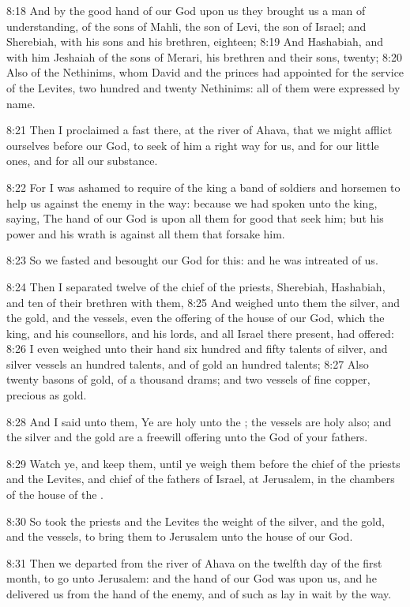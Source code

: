 8:18 And by the good hand of our God upon us they brought us a man of understanding, of the sons of Mahli, the son of Levi, the son of Israel; and Sherebiah, with his sons and his brethren, eighteen; 8:19 And Hashabiah, and with him Jeshaiah of the sons of Merari, his brethren and their sons, twenty; 8:20 Also of the Nethinims, whom David and the princes had appointed for the service of the Levites, two hundred and twenty Nethinims: all of them were expressed by name.

8:21 Then I proclaimed a fast there, at the river of Ahava, that we might afflict ourselves before our God, to seek of him a right way for us, and for our little ones, and for all our substance.

8:22 For I was ashamed to require of the king a band of soldiers and horsemen to help us against the enemy in the way: because we had spoken unto the king, saying, The hand of our God is upon all them for good that seek him; but his power and his wrath is against all them that forsake him.

8:23 So we fasted and besought our God for this: and he was intreated of us.

8:24 Then I separated twelve of the chief of the priests, Sherebiah, Hashabiah, and ten of their brethren with them, 8:25 And weighed unto them the silver, and the gold, and the vessels, even the offering of the house of our God, which the king, and his counsellors, and his lords, and all Israel there present, had offered: 8:26 I even weighed unto their hand six hundred and fifty talents of silver, and silver vessels an hundred talents, and of gold an hundred talents; 8:27 Also twenty basons of gold, of a thousand drams; and two vessels of fine copper, precious as gold.

8:28 And I said unto them, Ye are holy unto the \LORD; the vessels are holy also; and the silver and the gold are a freewill offering unto the \LORD God of your fathers.

8:29 Watch ye, and keep them, until ye weigh them before the chief of the priests and the Levites, and chief of the fathers of Israel, at Jerusalem, in the chambers of the house of the \LORD.

8:30 So took the priests and the Levites the weight of the silver, and the gold, and the vessels, to bring them to Jerusalem unto the house of our God.

8:31 Then we departed from the river of Ahava on the twelfth day of the first month, to go unto Jerusalem: and the hand of our God was upon us, and he delivered us from the hand of the enemy, and of such as lay in wait by the way.

